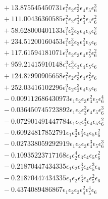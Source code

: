 \documentclass[10pt]{article}
\begin{document}
\begin{align*}
&{}  + 13.875545450731 \epsilon_{1}^{2} \epsilon_{2} \epsilon_{3}^{2} \epsilon_{4} \epsilon_{5} \epsilon_{6}^{3} \\
&{}  + 111.00436360585 \epsilon_{1}^{2} \epsilon_{2} \epsilon_{3}^{2} \epsilon_{4}^{2} \epsilon_{5} \epsilon_{6}^{2} \\
&{}  + 58.628000401133 \epsilon_{1}^{2} \epsilon_{2}^{3} \epsilon_{3} \epsilon_{4} \epsilon_{5} \epsilon_{6}^{2} \\
&{}  + 234.51200160453 \epsilon_{1}^{2} \epsilon_{2}^{3} \epsilon_{3} \epsilon_{4}^{2} \epsilon_{5} \epsilon_{6} \\
&{}  + 117.61594181071 \epsilon_{1}^{3} \epsilon_{2} \epsilon_{3} \epsilon_{4} \epsilon_{5}^{2} \epsilon_{6}^{2} \\
&{}  + 959.21415910148 \epsilon_{1}^{3} \epsilon_{2}^{3} \epsilon_{3} \epsilon_{4} \epsilon_{5} \epsilon_{6} \\
&{}  + 124.87990905658 \epsilon_{1}^{2} \epsilon_{2} \epsilon_{3}^{3} \epsilon_{4} \epsilon_{5}^{2} \epsilon_{6} \\
&{}  + 252.03416102296 \epsilon_{1}^{3} \epsilon_{2} \epsilon_{3}^{3} \epsilon_{4} \epsilon_{5} \epsilon_{6} \\
&{}  - 0.009112686430973 \epsilon_{1} \epsilon_{2} \epsilon_{3} \epsilon_{4}^{2} \epsilon_{5} \epsilon_{6}^{4} \\
&{}  - 0.036450745723892 \epsilon_{1} \epsilon_{2} \epsilon_{3}^{3} \epsilon_{4} \epsilon_{5} \epsilon_{6}^{3} \\
&{}  - 0.072901491447784 \epsilon_{1} \epsilon_{2} \epsilon_{3}^{4} \epsilon_{4} \epsilon_{5} \epsilon_{6}^{2} \\
&{}  - 0.60924817852791 \epsilon_{1} \epsilon_{2}^{3} \epsilon_{3}^{2} \epsilon_{4} \epsilon_{5} \epsilon_{6}^{2} \\
&{}  - 0.027338059292919 \epsilon_{1} \epsilon_{2} \epsilon_{3} \epsilon_{4}^{3} \epsilon_{5} \epsilon_{6}^{3} \\
&{}  - 0.10935223717168 \epsilon_{1} \epsilon_{2}^{4} \epsilon_{3} \epsilon_{4} \epsilon_{5} \epsilon_{6}^{2} \\
&{}  - 0.21870447434335 \epsilon_{1} \epsilon_{2} \epsilon_{3}^{3} \epsilon_{4} \epsilon_{5}^{3} \epsilon_{6} \\
&{}  - 0.21870447434335 \epsilon_{1} \epsilon_{2} \epsilon_{3}^{4} \epsilon_{4} \epsilon_{5}^{2} \epsilon_{6} \\
&{}  - 0.4374089486867 \epsilon_{1} \epsilon_{2} \epsilon_{3} \epsilon_{4}^{2} \epsilon_{5}^{4} \epsilon_{6} \\

\end{align*}
\end{document}
